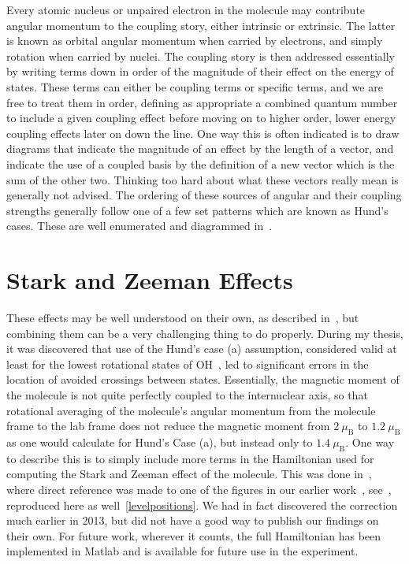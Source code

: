 Every atomic nucleus or unpaired electron in the molecule may contribute angular momentum to the coupling story, either intrinsic or extrinsic.
The latter is known as orbital angular momentum when carried by electrons, and simply rotation when carried by nuclei.
The coupling story is then addressed essentially by writing terms down in order of the magnitude of their effect on the energy of states.
These terms can either be coupling terms or specific terms, and we are free to treat them in order, defining as appropriate a combined quantum number to include a given coupling effect before moving on to higher order, lower energy coupling effects later on down the line.
One way this is often indicated is to draw diagrams that indicate the magnitude of an effect by the length of a vector, and indicate the use of a coupled basis by the definition of a new vector which is the sum of the other two.
Thinking too hard about what these vectors really mean is generally not advised.
The ordering of these sources of angular and their coupling strengths generally follow one of a few set patterns which are known as Hund's cases.
These are well enumerated and diagrammed in~\citep[Sec.~2.2.1-4]{StuhlThesis2012}.

\section{Stark and Zeeman Effects}


These effects may be well understood on their own, as described in~\citep[Sec.~2.3.1-2.1]{SawyerThesis2010}, but combining them can be a very challenging thing to do properly.
During my thesis, it was discovered that use of the Hund's case (a) assumption, considered valid at least for the lowest rotational states of OH~\citep[Sec.~2.2]{HudsonThesis2006}, led to significant errors in the location of avoided crossings between states.
Essentially, the magnetic moment of the molecule is not quite perfectly coupled to the internuclear axis, so that rotational averaging of the molecule's angular momentum from the molecule frame to the lab frame does not reduce the magnetic moment from $2~\mu_\text{B}$ to $1.2~\mu_\text{B}$ as one would calculate for Hund's Case (a), but instead only to $1.4~\mu_\text{B}$. 
One way to describe this is to simply include more terms in the Hamiltonian used for computing the Stark and Zeeman effect of the molecule.
This was done in~\cite{Maeda2015}, where direct reference was made to one of the figures in our earlier work~\cite{Stuhl2012evap}, see~\cite[Fig.~12]{Maeda2015}, reproduced here as well~\ref{levelpositions}.
We had in fact discovered the correction much earlier in 2013, but did not have a good way to publish our findings on their own.
For future work, wherever it counts, the full Hamiltonian has been implemented in Matlab and is available for future use in the experiment.


\ifx\justbeingincluded\undefined

\fi